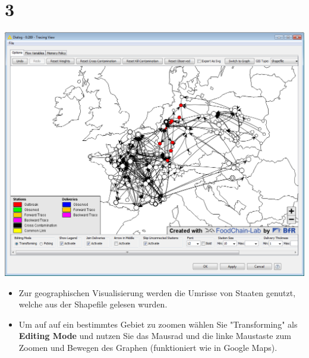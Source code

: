 \documentclass{beamer}
\begin{document}
\section{3}
\begin{frame}
	\begin{center}
  		\includegraphics[height=0.6\textheight]{3.png}
	\end{center}
	\begin{itemize}
		\item Zur geographischen Visualisierung werden die Umrisse von Staaten genutzt, welche aus der Shapefile gelesen wurden.
		\item Um auf auf ein bestimmtes Gebiet zu zoomen wählen Sie "Transforming" als \textbf{Editing Mode} und nutzen Sie das Mausrad und die linke Maustaste zum Zoomen und Bewegen des Graphen (funktioniert wie in Google Maps).
	\end{itemize}
\end{frame}
\end{document}

